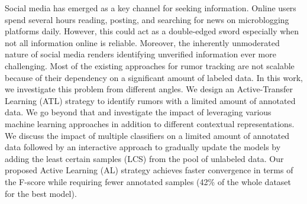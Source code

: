Social media has emerged as a key channel for seeking information. Online users spend several hours reading, posting, and searching for news on microblogging platforms daily. However, this could act as a double-edged sword especially when not all information online is reliable. Moreover, the inherently unmoderated nature of social media renders identifying unverified information ever more challenging. Most of the existing approaches for rumor tracking are not scalable because of their dependency on a significant amount of labeled data. In this work, we investigate this problem from different angles. We design an Active-Transfer Learning (ATL) strategy to identify rumors with a limited amount of annotated data. We go beyond that and investigate the impact of leveraging various machine learning approaches in addition to different contextual representations. We discuss the impact of multiple classifiers on a limited amount of annotated data followed by an interactive approach to gradually update the models by adding the least certain samples (LCS) from the pool of unlabeled data. Our proposed Active Learning (AL) strategy achieves faster convergence in terms of the F-score while requiring fewer annotated samples (42\% of the whole dataset for the best model).
